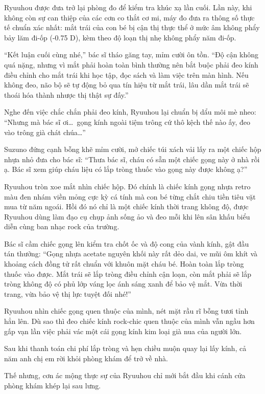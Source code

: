 \documentclass[../main.tex]{subfiles}
\begin{document}
Ryuuhou được đưa trở lại phòng đo để kiểm tra khúc xạ lần cuối. Lần này, khi không còn sự can thiệp của các cơn co thắt cơ mi, máy đo đưa ra thông số thực tế chuẩn xác nhất: mắt trái của con bé bị cận thị thực thể ở mức âm không phẩy bảy lăm đi-ốp (-0.75 D), kèm theo độ loạn thị nhẹ không phẩy năm đi-ốp.

``Kết luận cuối cùng nhé,'' bác sĩ tháo găng tay, mỉm cười ôn tồn. ``Độ cận không quá nặng, nhưng vì mắt phải hoàn toàn bình thường nên bắt buộc phải đeo kính điều chỉnh cho mắt trái khi học tập, đọc sách và làm việc trên màn hình. Nếu không đeo, não bộ sẽ tự động bỏ qua tín hiệu từ mắt trái, lâu dần mắt trái sẽ thoái hóa thành nhược thị thật sự đấy.''

Nghe đến việc chắc chắn phải đeo kính, Ryuuhou lại chuẩn bị dẩu môi mè nheo: ``Nhưng mà bác sĩ ơi\dots\ gọng kính ngoài tiệm trông cứ thô kệch thế nào ấy, đeo vào trông già chát chúa\dots''

Suzuno đứng cạnh bỗng khẽ mỉm cười, mở chiếc túi xách vải lấy ra một chiếc hộp nhựa nhỏ đưa cho bác sĩ: ``Thưa bác sĩ, cháu có sẵn một chiếc gọng này ở nhà rồi ạ. Bác sĩ xem giúp cháu liệu có lắp tròng thuốc vào gọng này được không ạ?''

Ryuuhou tròn xoe mắt nhìn chiếc hộp. Đó chính là chiếc kính gọng nhựa retro màu đen nhám viền mỏng cực kỳ cá tính mà con bé từng chắt chiu tiền tiêu vặt mua từ năm ngoái. Hồi đó nó chỉ là một chiếc kính thời trang không độ, được Ryuuhou dùng làm đạo cụ chụp ảnh sống ảo và đeo mỗi khi lên sân khấu biểu diễn cùng ban nhạc rock của trường.

Bác sĩ cầm chiếc gọng lên kiểm tra chốt ốc và độ cong của vành kính, gật đầu tán thưởng: ``Gọng nhựa acetate nguyên khối này rất dẻo dai, ve mũi ôm khít và khoảng cách đồng tử rất chuẩn với khuôn mặt cháu bé. Hoàn toàn lắp tròng thuốc vào được. Mắt trái sẽ lắp tròng điều chỉnh cận loạn, còn mắt phải sẽ lắp tròng không độ có phủ lớp váng lọc ánh sáng xanh để bảo vệ mắt. Vừa thời trang, vừa bảo vệ thị lực tuyệt đối nhé!''

Ryuuhou nhìn chiếc gọng quen thuộc của mình, nét mặt rầu rĩ bỗng tươi tỉnh hẳn lên. Dù sao thì đeo chiếc kính rock-chic quen thuộc của mình vẫn ngầu hơn gấp vạn lần việc phải vác một cái gọng kính kim loại già nua của người lớn.

Sau khi thanh toán chi phí lắp tròng và hẹn chiều muộn quay lại lấy kính, cả năm anh chị em rời khỏi phòng khám để trở về nhà.

\ct

Thế nhưng, cơn ác mộng thực sự của Ryuuhou chỉ mới bắt đầu khi cánh cửa phòng khám khép lại sau lưng.
\end{document}
